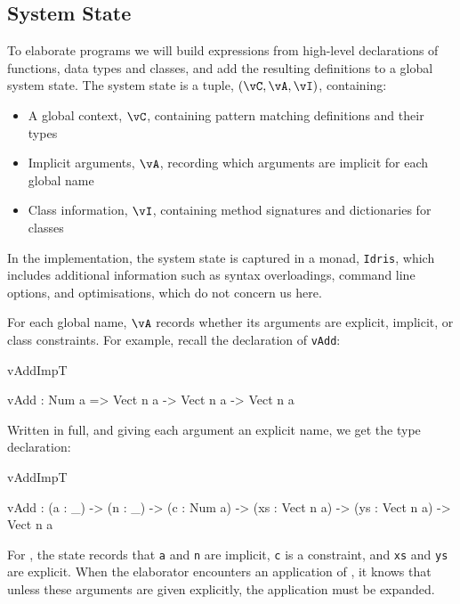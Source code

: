 


\subsection{System State}

\label{sect:sysstate}

To elaborate \Idris{} programs we will build expressions from high-level
declarations of functions, data types and classes, and add the resulting
definitions to a global system state.
The system state is a tuple, $(\vC,\vA,\vI)$, containing:

\begin{itemize}
\item A global context, $\vC$, containing pattern matching definitions and their types
\item Implicit arguments, $\vA$, recording which arguments are implicit for each global name
\item Class information, $\vI$, containing method signatures and dictionaries for classes
\end{itemize}

In the implementation, the system state is captured in a monad, \texttt{Idris},
which includes additional information such as syntax overloadings, command line
options, and optimisations, which do not concern us here. 

For each global name, $\vA$ records whether its arguments are explicit, implicit,
or class constraints.  For example, recall the declaration
of \texttt{vAdd}:

\begin{SaveVerbatim}{vAddImpT}

vAdd : Num a => Vect n a -> Vect n a -> Vect n a

\end{SaveVerbatim}

\noindent
Written in full, and giving each argument an explicit name, we get the
type declaration:

\begin{SaveVerbatim}{vAddImpT}

vAdd : (a : _) -> (n : _) -> (c : Num a) -> 
       (xs : Vect n a) -> (ys : Vect n a) -> Vect n a

\end{SaveVerbatim}

\noindent
For , the state records that \texttt{a} and \texttt{n} are implicit, 
\texttt{c} is a constraint, and \texttt{xs} and \texttt{ys} are explicit. When
the elaborator encounters an application of , it knows that unless these arguments
are given explicitly, the application must be expanded.

